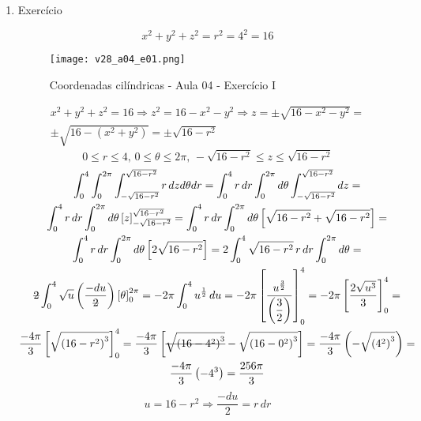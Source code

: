 \begin{enumerate}
	\item Exercício
	
	\begin{equation*}
		x^2 + y^2 + z^2 = r^2 = 4^2 = 16 
	\end{equation*}
	
	\begin{figure}[htb]
		\caption{Coordenadas cilíndricas - Aula 04 - Exercício I}
		\label{v28_a04_e01}
		\centering
		\texttt{[image: v28\_a04\_e01.png]}		
	\end{figure}
	
	\begin{gather*}
		x^2 + y^2 + z^2 = 16 \Rightarrow z^2 = 16 - x^2 - y^2 \Rightarrow z = \pm\sqrt{16 - x^2 - y^2} =\\ \pm\sqrt{16 - \left(x^2 + y^2\right)} = \pm\sqrt{16 - r^2}
	\end{gather*}
	\begin{equation*}
		0 \leq r \leq 4,\, 0 \leq \theta \leq 2\pi,\, -\sqrt{16 - r^2} \leq z \leq \sqrt{16 - r^2}
	\end{equation*}
	\begin{gather*}
		\int_0^4 \int_0^{2\pi} \int_{-\sqrt{16 - r^2}}^{\sqrt{16 - r^2}} r\, dz d\theta dr = \int_0^4 r\, dr \int_0^{2\pi} d\theta \int_{-\sqrt{16 - r^2}}^{\sqrt{16 - r^2}} dz =\\ \int_0^4 r\, dr \int_0^{2\pi} d\theta \left[z\right]_{-\sqrt{16 - r^2}}^{\sqrt{16 - r^2}} = \int_0^4 r\, dr \int_0^{2\pi} d\theta \left[\sqrt{16 - r^2} + \sqrt{16 - r^2}\right] =\\ \int_0^4 r\, dr \int_0^{2\pi} d\theta \left[2\sqrt{16 - r^2}\right] = 2\int_0^4 \sqrt{16 - r^2}\,r\, dr \int_0^{2\pi} d\theta =\\ {\overstrike{2}}\int_0^4 \sqrt{u}\left(\dfrac{-du}{\overstrike{2}}\right) \left[\theta\right]_0^{2\pi} = -2\pi\int_0^4 u^{\frac{1}{2}}\, du = -2\pi \left[\dfrac{u^{\frac{3}{2}}}{\left(\dfrac{3}{2}\right)}\right]_0^4 = -2\pi\left[\dfrac{2\sqrt{u^3}}{3}\right]_0^4 =\\ \dfrac{-4\pi}{3}\left[\sqrt{\left(16 - r^2\right)^3}\right]_0^4 = \dfrac{-4\pi}{3}\left[\overstrike{\sqrt{\left(16 - 4^2\right)^3}} - \sqrt{\left(16 - 0^2\right)^3}\right] = \dfrac{-4\pi}{3}\left(-\sqrt{\left(4^2\right)^3}\right) =\\ \dfrac{-4\pi}{3}\left(-4^3\right) = \dfrac{256\pi}{3}
	\end{gather*}
	\begin{equation*}
		u = 16 - r^2 \Rightarrow \dfrac{-du}{2} = r\, dr
	\end{equation*}
\end{enumerate}